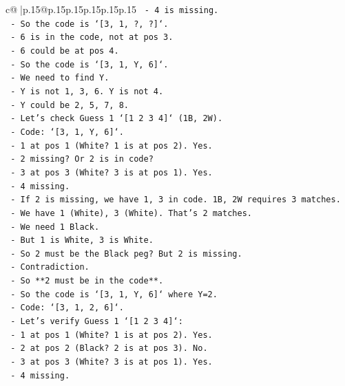 \documentclass{article}
\begin{document}
{\begin{supertabular}{c@{$\;$}|p{.15\linewidth}@{}p{.15\linewidth}p{.15\linewidth}p{.15\linewidth}p{.15\linewidth}p{.15\linewidth}}
{{{\texttt{      {-} 4 is missing.} \\
\texttt{    {-} So the code is `{[}3, 1, ?, ?{]}`.} \\
\texttt{    {-} 6 is in the code, not at pos 3.} \\
\texttt{    {-} 6 could be at pos 4.} \\
\texttt{    {-} So the code is `{[}3, 1, Y, 6{]}`.} \\
\texttt{    {-} We need to find Y.} \\
\texttt{    {-} Y is not 1, 3, 6. Y is not 4.} \\
\texttt{    {-} Y could be 2, 5, 7, 8.} \\
\texttt{    {-} Let's check Guess 1 `{[}1 2 3 4{]}` (1B, 2W).} \\
\texttt{      {-} Code: `{[}3, 1, Y, 6{]}`.} \\
\texttt{      {-} 1 at pos 1 (White? 1 is at pos 2). Yes.} \\
\texttt{      {-} 2 missing? Or 2 is in code?} \\
\texttt{      {-} 3 at pos 3 (White? 3 is at pos 1). Yes.} \\
\texttt{      {-} 4 missing.} \\
\texttt{      {-} If 2 is missing, we have 1, 3 in code. 1B, 2W requires 3 matches.} \\
\texttt{      {-} We have 1 (White), 3 (White). That's 2 matches.} \\
\texttt{      {-} We need 1 Black.} \\
\texttt{      {-} But 1 is White, 3 is White.} \\
\texttt{      {-} So 2 must be the Black peg? But 2 is missing.} \\
\texttt{      {-} Contradiction.} \\
\texttt{      {-} So **2 must be in the code**.} \\
\texttt{      {-} So the code is `{[}3, 1, Y, 6{]}` where Y=2.} \\
\texttt{      {-} Code: `{[}3, 1, 2, 6{]}`.} \\
\texttt{      {-} Let's verify Guess 1 `{[}1 2 3 4{]}`:} \\
\texttt{        {-} 1 at pos 1 (White? 1 is at pos 2). Yes.} \\
\texttt{        {-} 2 at pos 2 (Black? 2 is at pos 3). No.} \\
\texttt{        {-} 3 at pos 3 (White? 3 is at pos 1). Yes.} \\
\texttt{        {-} 4 missing.} \\
}}}
\end{supertabular}}
\end{document}
